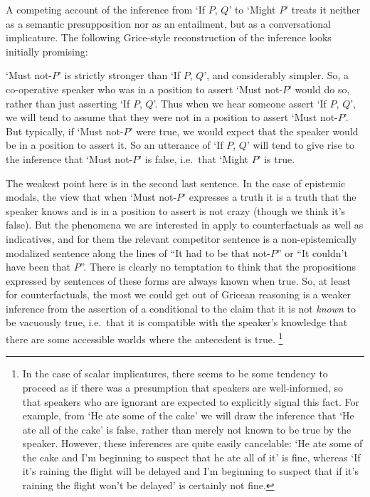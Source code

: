 \documentclass[If.tex]{subfiles}
\begin{document}
A competing account of the inference from ‘If $P$, $Q$’ to ‘Might $P$’ treats it neither as a semantic presupposition nor as an entailment, but as a conversational implicature.  The following Grice-style reconstruction of the inference looks initially promising:
\begin{prop}
	\item
	‘Must not-$P$’ is strictly stronger than ‘If $P$, $Q$’, and considerably simpler.  So, a co-operative speaker who was in a position to assert ‘Must not-$P$’ would do so, rather than just asserting ‘If $P$, $Q$’.   Thus when we hear someone assert ‘If $P$, $Q$’, we will tend to assume that they were not in a position to assert ‘Must not-$P$’.  But typically, if ‘Must not-$P$’ were true, we would expect that the speaker would be in a position to assert it.  So an utterance of ‘If $P$, $Q$’ will tend to give rise to the inference that ‘Must not-$P$’ is false, i.e.\ that ‘Might $P$’ is true.  
\end{prop}
The weakest point here is in the second last sentence.  In the case of epistemic modals, the view that when ‘Must not-$P$’ expresses a truth it is a truth that the speaker knows and is in a position to assert is not crazy (though we think it's false).  But the phenomena we are interested in apply to counterfactuals as well as indicatives, and for them the relevant competitor sentence is a non-epistemically modalized sentence along the lines of “It had to be that not-$P$” or “It couldn't have been that $P$”.  There is clearly no temptation to think that the propositions expressed by sentences of these forms are always known when true.  So, at least for counterfactuals, the most we could get out of Gricean reasoning is a weaker inference from the assertion of a conditional to the claim that it is not \emph{known} to be vacuously true, i.e.\ that it is compatible with the speaker's knowledge that there are some accessible worlds where the antecedent is true.%
\footnote{In the case of scalar implicatures, there seems to be some tendency to proceed as if there was a presumption that speakers are well-informed, so that speakers who are ignorant are expected to explicitly signal this fact.  For example, from ‘He ate some of the cake’ we will draw the inference that ‘He ate all of the cake’ is false, rather than merely not known to be true by the speaker.  However, these inferences are quite easily cancelable: ‘He ate some of the cake and I'm beginning to suspect that he ate all of it’ is fine, whereas ‘If it's raining the flight will be delayed and I'm beginning to suspect that if it's raining the flight won't be delayed’ is certainly not fine.}  
\end{document}
